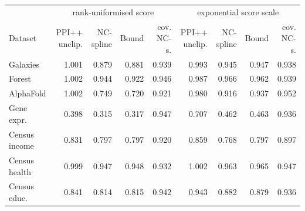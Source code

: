 \begin{tabular}{lrrrrrrrr}
\toprule
 & \multicolumn{4}{c}{rank-uniformised score} & \multicolumn{4}{c}{exponential score scale} \\
Dataset & PPI++ unclip. & NC-spline & Bound & cov. NC-s. & PPI++ unclip. & NC-spline & Bound & cov. NC-s. \\
\midrule
Galaxies & 1.001 & 0.879 & 0.881 & 0.939 & 0.993 & 0.945 & 0.947 & 0.938 \\
Forest & 1.002 & 0.944 & 0.922 & 0.946 & 0.987 & 0.966 & 0.962 & 0.939 \\
AlphaFold & 1.002 & 0.749 & 0.720 & 0.921 & 0.980 & 0.916 & 0.937 & 0.952 \\
Gene expr. & 0.398 & 0.315 & 0.317 & 0.947 & 0.707 & 0.462 & 0.463 & 0.936 \\
Census income & 0.831 & 0.797 & 0.797 & 0.920 & 0.859 & 0.768 & 0.797 & 0.897 \\
Census health & 0.999 & 0.947 & 0.948 & 0.932 & 1.002 & 0.963 & 0.965 & 0.947 \\
Census educ. & 0.841 & 0.814 & 0.815 & 0.942 & 0.943 & 0.882 & 0.879 & 0.936 \\
\bottomrule
\end{tabular}